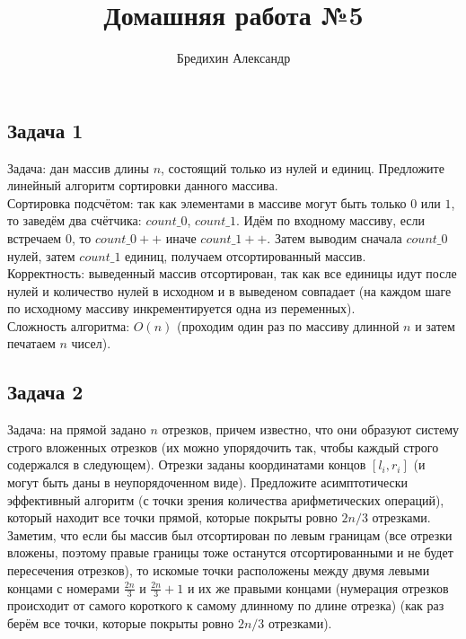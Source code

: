 \documentclass[a4paper,12pt]{article} %
\author{Бредихин Александр}
\title{Домашняя работа №5}
\begin{document}

\maketitle

\subsection*{Задача 1}
Задача: дан массив длины $n$, состоящий только из нулей и единиц. Предложите линейный алгоритм сортировки данного массива.\\

Сортировка подсчётом: так как элементами в массиве могут быть только $ 0 $ или $ 1 $, то заведём два счётчика: $ count\_0  $, $ count\_1 $. Идём по входному массиву, если встречаем 0, то $ count\_0 ++ $ иначе $ count\_1 ++$. Затем выводим сначала $ count\_0 $ нулей, затем $ count\_1 $ единиц, получаем отсортированный массив.\\
Корректность: выведенный массив отсортирован, так как все единицы идут после нулей и количество нулей в исходном и в выведеном совпадает (на каждом шаге по исходному массиву инкрементируется одна из переменных).\\ Сложность алгоритма: $ O(n) $ (проходим один раз по массиву длинной $ n $ и затем печатаем $ n $ чисел).


\subsection*{Задача 2}
Задача: на прямой задано $n$ отрезков, причем известно, что они образуют систему строго вложенных отрезков (их можно упорядочить так, чтобы каждый строго содержался в следующем). Отрезки заданы координатами концов $[l_i, r_i]$ (и могут быть даны в неупорядоченном виде). Предложите асимптотически эффективный алгоритм (с точки зрения количества арифметических операций), который находит все точки прямой, которые покрыты ровно $2n/3$ отрезками.\\

Заметим, что если бы массив был отсортирован по левым границам (все отрезки вложены, поэтому правые границы тоже останутся отсортированными и не будет пересечения отрезков), то искомые точки расположены между двумя левыми концами с номерами $ \frac{2n}{3} $ и $ \frac{2n}{3}+1 $ и их же правыми концами (нумерация отрезков происходит от самого короткого к самому длинному по длине отрезка) (как раз берём все точки, которые покрыты ровно  $2n/3$ отрезками).\\
\end{document}
